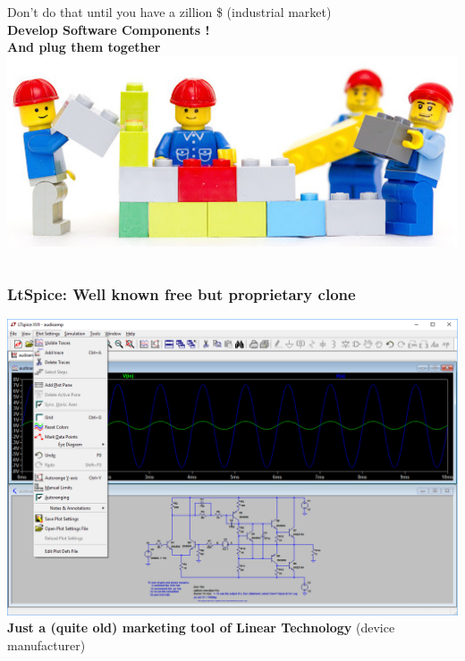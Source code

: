 \begin{frame}
\begin{columns}
\begin{column}[t]{.5\textwidth}
      \alert{Don't do that} until you have a zillion \$ (industrial market) \\[1em]
      \alert{\textbf{Develop Software Components !}} \\
      \alert{\textbf{And plug them together}} \\
      \includegraphics[width=.5\textwidth]{images/lego2.jpg}
    \end{column}
  \end{columns}
\end{frame}

\begin{frame}
  \frametitle{LtSpice: Well known free but proprietary clone}
  \begin{center}
    \includegraphics[width=.6\textwidth]{images/ltspice-1.png} \\[1em]
    \textbf{Just a (quite old) marketing tool of Linear Technology} {\tiny (device manufacturer)}
  \end{center}
\end{frame}

